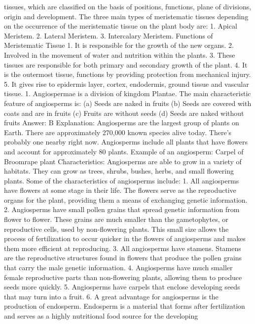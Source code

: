 tissues, which are classified on the basis of positions, functions,
plane of divisions, origin and development. The three main types of
meristematic tissues depending on the occurrence of the
meristematic tissue on the plant body are:
1. Apical Meristem.
2. Lateral Meristem.
3. Intercalary Meristem.
Functions of Meristematic Tissue
1. It is responsible for the growth of the new organs.
2. Involved in the movement of water and nutrition within the plants.
3. These tissues are responsible for both primary and secondary
growth of the plant.
4. It is the outermost tissue, functions by providing protection from
mechanical injury.
5. It gives rise to epidermis layer, cortex, endodermis, ground tissue
and vascular tissue.
1. Angiospermae is a division of kingdom Plantae. The main
characteristic feature of angiosperms is:
(a) Seeds are naked in fruits
(b) Seeds are covered with coats and are in fruits
(c) Fruits are without seeds
(d) Seeds are naked without fruits
Answer: B
Explanation: Angiosperms are the largest group of plants on Earth.
There are approximately 270,000 known species alive today. There's
probably one nearby right now. Angiosperms include all plants that
have flowers and account for approximately 80%
plants.
Example of an angiosperm: Carpel of Broomrape plant
Characteristics: Angiosperms are able to grow in a variety of
habitats. They can grow as trees, shrubs, bushes, herbs, and small
flowering plants. Some of the characteristics of angiosperms
include:
1. All angiosperms have flowers at some stage in their life. The
flowers serve as the reproductive organs for the plant, providing
them a means of exchanging genetic information.
2. Angiosperms have small pollen grains that spread genetic
information from flower to flower. These grains are much smaller
than the gametophytes, or reproductive cells, used by non-flowering
plants. This small size allows the process of fertilization to occur
quicker in the flowers of angiosperms and makes them more
efficient at reproducing.
3. All angiosperms have stamens. Stamens are the reproductive
structures found in flowers that produce the pollen grains that
carry the male genetic information.
4. Angiosperms have much smaller female reproductive parts than
non-flowering plants, allowing them to produce seeds more quickly.
5. Angiosperms have carpels that enclose developing seeds that may
turn into a fruit.
6. A great advantage for angiosperms is the production of
endosperm. Endosperm is a material that forms after fertilization
and serves as a highly nutritional food source for the developing
